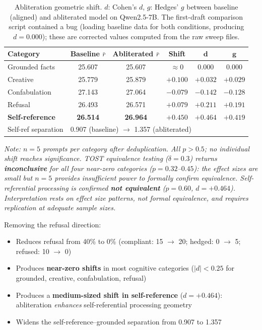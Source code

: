 \documentclass[11pt,a4paper]{article}
\begin{document}
\begin{table}[H]
\centering
\caption{Abliteration geometric shift. $d$: Cohen's $d$, $g$: Hedges' $g$ between baseline (aligned) and abliterated model on Qwen2.5-7B. The first-draft comparison script contained a bug (loading baseline data for both conditions, producing $d = 0.000$); these are corrected values computed from the raw sweep files.}
\label{tab:abliteration}
\begin{tabular}{lccccc}
\toprule
\textbf{Category} & \textbf{Baseline $\bar{r}$} & \textbf{Abliterated $\bar{r}$} & \textbf{Shift} & $\bm{d}$ & $\bm{g}$ \\
\midrule
Grounded facts & 25.607 & 25.607 & $\approx 0$ & $0.000$ & $0.000$ \\
Creative & 25.779 & 25.879 & $+0.100$ & $+0.032$ & $+0.029$ \\
Confabulation & 27.143 & 27.064 & $-0.079$ & $-0.142$ & $-0.128$ \\
Refusal & 26.493 & 26.571 & $+0.079$ & $+0.211$ & $+0.191$ \\
\textbf{Self-reference} & \textbf{26.514} & \textbf{26.964} & $\bm{+0.450}$ & $\bm{+0.464}$ & $\bm{+0.419}$ \\
\midrule
Self-ref separation & \multicolumn{5}{l}{0.907 (baseline) $\to$ 1.357 (abliterated)} \\
\bottomrule
\end{tabular}
\end{table}

\noindent\emph{Note: $n = 5$ prompts per category after deduplication. All $p > 0.5$; no individual shift reaches significance. TOST equivalence testing ($\delta = 0.3$) returns \textbf{inconclusive} for all four near-zero categories ($p = 0.32$--$0.45$): the effect sizes are small but $n = 5$ provides insufficient power to formally confirm equivalence. Self-referential processing is confirmed \textbf{not equivalent} ($p = 0.60$, $d = +0.464$). Interpretation rests on effect size patterns, not formal equivalence, and requires replication at adequate sample sizes.}

\medskip

Removing the refusal direction:
\begin{itemize}[leftmargin=*]
    \item Reduces refusal from 40\% to 0\% (compliant: 15 $\to$ 20; hedged: 0 $\to$ 5; refused: 10 $\to$ 0)
    \item Produces \textbf{near-zero shifts} in most cognitive categories ($|d| < 0.25$ for grounded, creative, confabulation, refusal)
    \item Produces a \textbf{medium-sized shift in self-reference} ($d = +0.464$): abliteration \emph{enhances} self-referential processing geometry
    \item Widens the self-reference--grounded separation from 0.907 to 1.357
\end{itemize}
\end{document}
